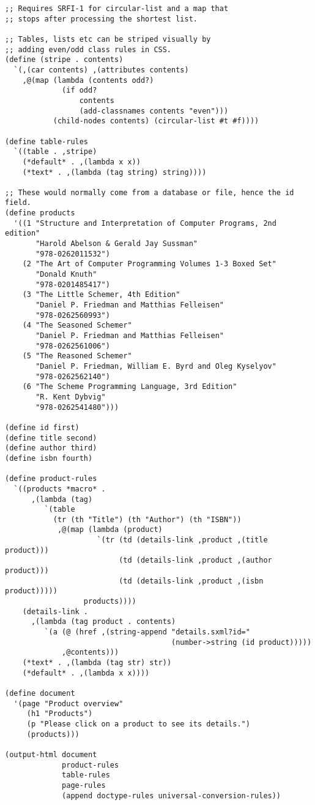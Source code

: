 \documentclass{article}
\begin{document}
\begin{verbatim}
;; Requires SRFI-1 for circular-list and a map that
;; stops after processing the shortest list.

;; Tables, lists etc can be striped visually by
;; adding even/odd class rules in CSS.
(define (stripe . contents)
  `(,(car contents) ,(attributes contents)
    ,@(map (lambda (contents odd?)
             (if odd?
                 contents
                 (add-classnames contents "even")))
           (child-nodes contents) (circular-list #t #f))))

(define table-rules
  `((table . ,stripe)
    (*default* . ,(lambda x x))
    (*text* . ,(lambda (tag string) string))))

;; These would normally come from a database or file, hence the id field.
(define products
  '((1 "Structure and Interpretation of Computer Programs, 2nd edition"
       "Harold Abelson & Gerald Jay Sussman"
       "978-0262011532")
    (2 "The Art of Computer Programming Volumes 1-3 Boxed Set"
       "Donald Knuth"
       "978-0201485417")
    (3 "The Little Schemer, 4th Edition"
       "Daniel P. Friedman and Matthias Felleisen"
       "978-0262560993")
    (4 "The Seasoned Schemer"
       "Daniel P. Friedman and Matthias Felleisen"
       "978-0262561006")
    (5 "The Reasoned Schemer"
       "Daniel P. Friedman, William E. Byrd and Oleg Kyselyov"
       "978-0262562140")
    (6 "The Scheme Programming Language, 3rd Edition"
       "R. Kent Dybvig"
       "978-0262541480")))

(define id first)
(define title second)
(define author third)
(define isbn fourth)

(define product-rules
  `((products *macro* .
      ,(lambda (tag)
         `(table
           (tr (th "Title") (th "Author") (th "ISBN"))
            ,@(map (lambda (product)
                     `(tr (td (details-link ,product ,(title product)))
                          (td (details-link ,product ,(author product)))
                          (td (details-link ,product ,(isbn product)))))
                  products))))
    (details-link .
      ,(lambda (tag product . contents)
         `(a (@ (href ,(string-append "details.sxml?id="
                                      (number->string (id product)))))
             ,@contents)))
    (*text* . ,(lambda (tag str) str))
    (*default* . ,(lambda x x))))

(define document
  '(page "Product overview"
     (h1 "Products")
     (p "Please click on a product to see its details.")
     (products)))

(output-html document
             product-rules
             table-rules
             page-rules
             (append doctype-rules universal-conversion-rules))
\end{verbatim}
\end{document}
